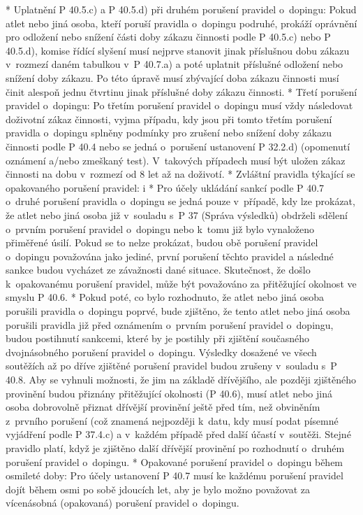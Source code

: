   * Uplatnění P 40.5.c) a P 40.5.d) při druhém porušení pravidel o~dopingu: Pokud atlet nebo jiná osoba, kteří poruší pravidla o~dopingu podruhé, prokáží oprávnění pro odložení nebo snížení části doby zákazu činnosti podle P 40.5.c) nebo P 40.5.d), komise řídící slyšení musí nejprve stanovit jinak příslušnou dobu zákazu v~rozmezí daném tabulkou v~P 40.7.a) a poté uplatnit příslušné odložení nebo snížení doby zákazu. Po této úpravě musí zbývající doba zákazu činnosti musí činit alespoň jednu čtvrtinu jinak příslušné doby zákazu činnosti.
  * Třetí porušení pravidel o~dopingu:  Po třetím porušení pravidel o~dopingu musí vždy následovat doživotní zákaz činnosti, vyjma případu,  kdy jsou při tomto třetím porušení pravidla o~dopingu splněny podmínky pro zrušení nebo snížení doby zákazu činnosti podle P 40.4 nebo se jedná o~porušení ustanovení P 32.2.d) (opomenutí oznámení a/nebo zmeškaný test). V~takových případech musí být uložen zákaz činnosti na dobu v~rozmezí od 8 let až na doživotí.
  * Zvláštní pravidla týkající se opakovaného porušení pravidel:
    \begitems \style i
    * Pro účely ukládání sankcí podle P 40.7 o~druhé porušení pravidla o~dopingu se jedná pouze v~případě, kdy lze prokázat, že atlet nebo jiná osoba již v~souladu s~P 37 (Správa výsledků) obdrželi sdělení o~prvním porušení pravidel o~dopingu nebo k~tomu již bylo vynaloženo přiměřené úsilí. Pokud se to nelze prokázat, budou obě porušení pravidel o~dopingu považována jako jediné, první porušení těchto pravidel a následné sankce budou vycházet ze závažnosti dané situace. Skutečnost, že došlo k~opakovanému porušení pravidel, může být považováno za přitěžující okolnost ve smyslu P 40.6.
    * Pokud poté, co bylo rozhodnuto, že atlet nebo jiná osoba porušili pravidla o~dopingu poprvé, bude zjištěno, že tento atlet nebo jiná osoba porušili pravidla již před oznámením o~prvním porušení pravidel o~dopingu, budou postihnutí sankcemi, které by je postihly při zjištění současného dvojnásobného porušení pravidel o~dopingu. Výsledky dosažené ve všech soutěžích až po dříve zjištěné porušení pravidel budou zrušeny v~souladu s~P 40.8. Aby se vyhnuli možnosti, že jim na základě dřívějšího, ale později zjištěného provinění budou přiznány přitěžující okolnosti (P 40.6), musí atlet nebo jiná osoba dobrovolně přiznat dřívější provinění ještě před tím, než obviněním z~prvního porušení (což znamená nejpozději k~datu, kdy musí podat písemné vyjádření podle P 37.4.c) a v~každém případě před další účastí v~soutěži. Stejné pravidlo platí, když je zjištěno další dřívější provinění po rozhodnutí o~druhém porušení pravidel o~dopingu.
    \enditems
  * Opakované porušení pravidel o~dopingu během osmileté doby: Pro účely ustanovení P 40.7 musí ke každému porušení pravidel dojít během osmi po sobě jdoucích let, aby je bylo možno považovat za vícenásobná (opakovaná) porušení pravidel o~dopingu.
  \enditems

